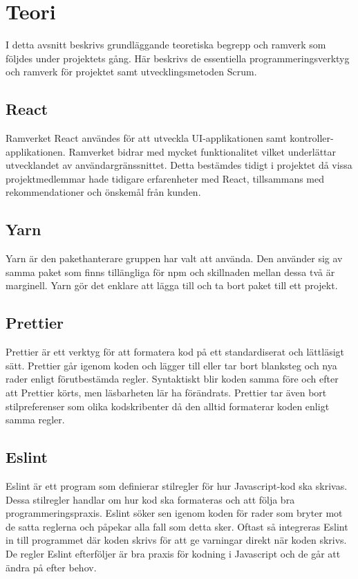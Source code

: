 \chapter{Teori}
\label{cha:theory}
I detta avsnitt beskrivs grundläggande teoretiska begrepp och ramverk som följdes under projektets gång. Här beskrivs de essentiella programmeringsverktyg och ramverk för projektet samt utvecklingsmetoden Scrum. 

\section{React}
Ramverket React användes för att utveckla UI-applikationen samt kontroller-applikationen.\cite{React} Ramverket bidrar med mycket funktionalitet vilket underlättar utvecklandet av användargränssnittet.  Detta bestämdes tidigt i projektet då vissa projektmedlemmar hade tidigare erfarenheter med React, tillsammans med rekommendationer och önskemål från kunden.

\section{Yarn}
Yarn är den pakethanterare gruppen har valt att använda.\cite{Yarn} Den använder sig av samma paket som finns tillängliga för npm och skillnaden mellan dessa två är marginell. Yarn gör det enklare att lägga till och ta bort paket till ett projekt.

\section{Prettier}
Prettier är ett verktyg för att formatera kod på ett standardiserat och lättläsigt sätt.\cite{prettier} Prettier går igenom koden och lägger till eller tar bort blanksteg och nya rader enligt förutbestämda regler. Syntaktiskt blir koden samma före och efter att Prettier körts, men läsbarheten lär ha förändrats. Prettier tar även bort stilpreferenser som olika kodskribenter då den alltid formaterar koden enligt samma regler.


\section{Eslint}
Eslint är ett program som definierar stilregler för hur Javascript-kod ska skrivas.\cite{eslint} Dessa stilregler handlar om hur kod ska formateras och att följa bra programmeringspraxis. Eslint söker sen igenom koden för rader som bryter mot de satta reglerna och påpekar alla fall som detta sker. Oftast så integreras Eslint in till programmet där koden skrivs för att ge varningar direkt när koden skrivs. De regler Eslint efterföljer är bra praxis för kodning i Javascript och de går att ändra på efter behov.


